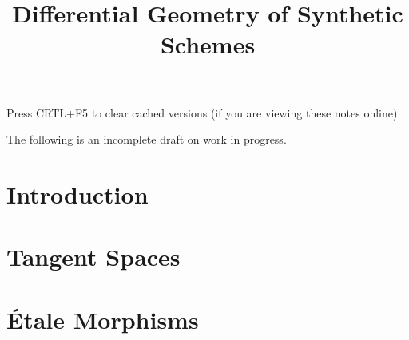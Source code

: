 \documentclass{../util/zariski}
\title{Differential Geometry of Synthetic Schemes}
\begin{document}
\maketitle

\begin{center}
  \color{purple}
  \large{Press CRTL+F5 to clear cached versions}
  \large{(if you are viewing these notes online)}
\end{center}

The following is an incomplete draft on work in progress.

\tableofcontents

\section*{Introduction}


\section{Tangent Spaces}


\section{Étale Morphisms}


\printindex

\printbibliography
\end{document}
